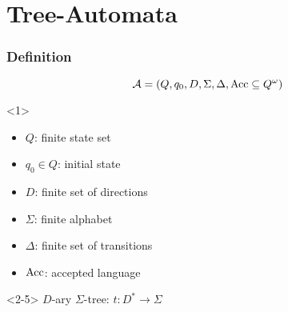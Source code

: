 \documentclass{beamer}
\begin{document}
  \section{Tree-Automata}
  \begin{frame}
    \frametitle{Definition}
    \begin{overlayarea}{\textwidth}{0.2\textheight}
      \begin{equation*}
        \mathcal{A} = \left(Q, q_{0}, D, \Sigma, \Delta,
          \operatorname{Acc}\subseteq Q^{\omega}\right)
      \end{equation*}
    \end{overlayarea}
    \begin{overlayarea}{\textwidth}{0.6\textheight}
      \begin{onlyenv}<1>
        \begin{itemize}
          \item $Q$: finite state set
          \item $q_{0}\in Q$: initial state
          \item $D$: finite set of directions
          \item $\Sigma$: finite alphabet
          \item $\Delta$: finite set of transitions
          \item $\operatorname{Acc}$: accepted language
        \end{itemize}
      \end{onlyenv}
      \begin{onlyenv}<2-5>
        $D$-ary $\Sigma$-tree: $t:D^{*}\rightarrow\Sigma$\hfill
        \begin{center}
        \end{center}
      \end{onlyenv}
    \end{overlayarea}
    \begin{overlayarea}{\textwidth}{0.2\textheight}
    \end{overlayarea}
  \end{frame}
\end{document}

